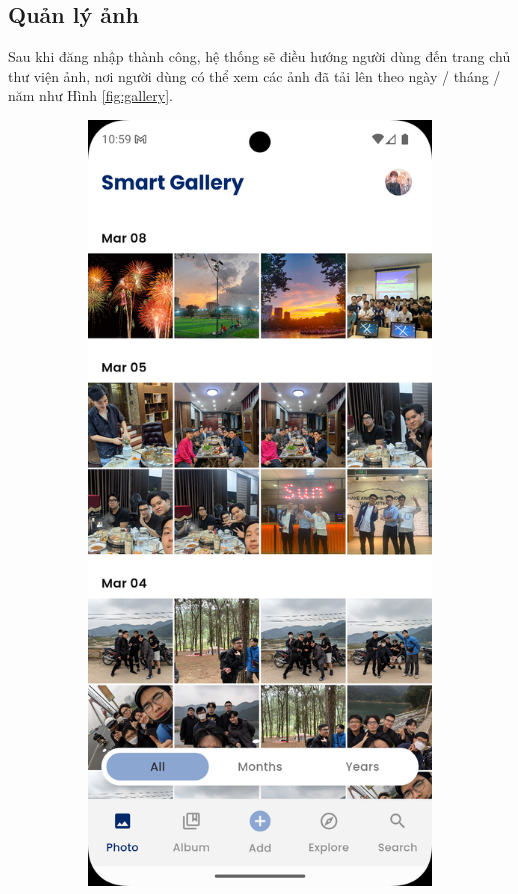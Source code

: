 \subsection{Quản lý ảnh}

Sau khi đăng nhập thành công, hệ thống sẽ điều hướng người dùng đến trang chủ thư viện ảnh, nơi người dùng có thể xem các ảnh đã tải lên theo ngày / tháng / năm như Hình \ref{fig:gallery}.

\begin{figure}[H]
    \centering
    \begin{subfigure}{0.48\textwidth}
        \includegraphics[width=1\linewidth]{figures/c4/4-2/gallery_1.png} 

\end{subfigure}
\end{figure}
